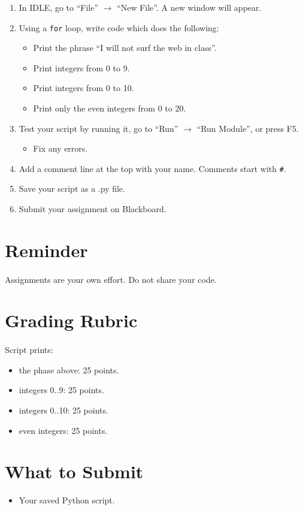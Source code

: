\documentclass[letter,10pt]{article}
\begin{document}
    \begin{enumerate}
        \item In IDLE, go to ``File'' $\rightarrow$ ``New File''. A new window will appear.
        \item Using a \texttt{for} loop, write code which does the following:
        \begin{itemize}
            \item Print the phrase ``I will not surf the web in class''.
            \item Print integers from 0 to 9.
            \item Print integers from 0 to 10.
            \item Print only the even integers from 0 to 20.
        \end{itemize}
        \item Test your script by running it, go to ``Run'' $\rightarrow$ ``Run Module'', or press F5.
        \begin{itemize}
            \item Fix any errors.
        \end{itemize}
        \item Add a comment line at the top with your name. Comments start with \texttt{\#}.
        \item Save your script as a .py file.
        \item Submit your assignment on Blackboard.
    \end{enumerate}

    \section*{Reminder}
    \paragraph{}Assignments are your own effort. Do not share your code.

    \section*{Grading Rubric}
    \paragraph{}Script prints:
    \begin{itemize}
        \item the phase above: 25 points.
        \item integers 0..9: 25 points.
        \item integers 0..10: 25 points.
        \item even integers: 25 points.
    \end{itemize}
    
    \section*{What to Submit}
    \begin{itemize}
        \item Your saved Python script.
    \end{itemize}
    
\end{document}
